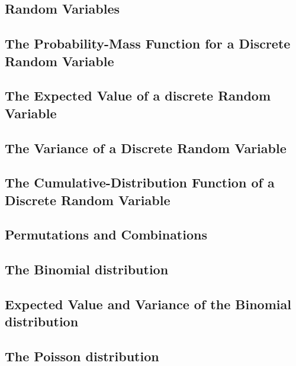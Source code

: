 \documentclass[12pt,]{article}
\theoremstyle{definition}
\theoremstyle{definition}
\theoremstyle{definition}
\theoremstyle{remark}
\begin{document}
\subsection{Random Variables}\label{random-variables}

\subsection{The Probability-Mass Function for a Discrete Random
Variable}\label{the-probability-mass-function-for-a-discrete-random-variable}

\subsection{The Expected Value of a discrete Random
Variable}\label{the-expected-value-of-a-discrete-random-variable}

\subsection{The Variance of a Discrete Random
Variable}\label{the-variance-of-a-discrete-random-variable}

\subsection{The Cumulative-Distribution Function of a Discrete Random
Variable}\label{the-cumulative-distribution-function-of-a-discrete-random-variable}

\subsection{Permutations and
Combinations}\label{permutations-and-combinations}

\subsection{The Binomial distribution}\label{the-binomial-distribution}

\subsection{Expected Value and Variance of the Binomial
distribution}\label{expected-value-and-variance-of-the-binomial-distribution}

\subsection{The Poisson distribution}\label{the-poisson-distribution}
\end{document}
